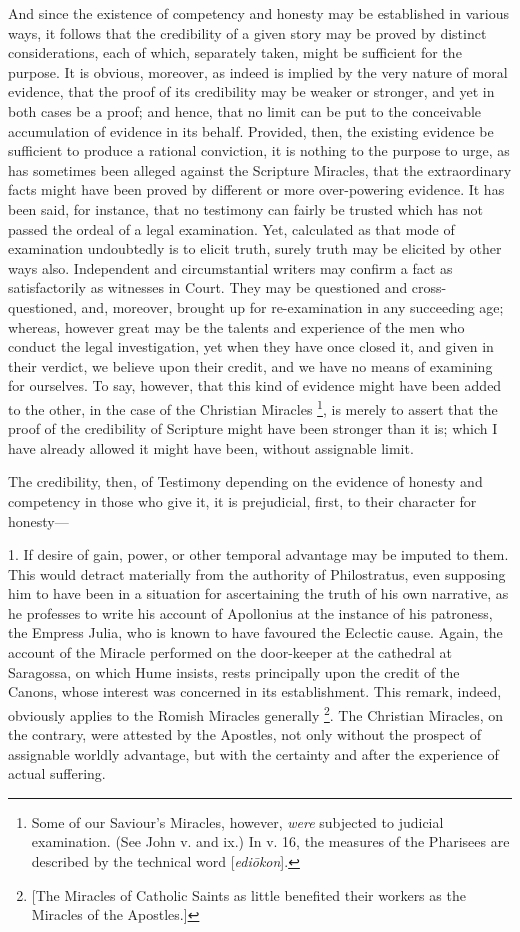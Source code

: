 And since the existence of competency and honesty
may be established in various ways, it follows that the credibility of
a given story may be proved by distinct considerations, each of which,
separately taken, might be sufficient for the purpose. It is obvious,
moreover, as indeed is implied by the very nature of moral evidence,
that the proof of its credibility may be weaker or stronger, and yet
in both cases be a proof; and hence, that no limit can be put to the
conceivable accumulation of evidence in its behalf. Provided, then,
the existing evidence be sufficient to produce a rational conviction,
it is nothing to the purpose to urge, as has sometimes been alleged
against the Scripture Miracles, that the extraordinary facts might
have been proved by different or more over-powering evidence. It has
been said, for instance, that no testimony can fairly be trusted which
has not passed the ordeal of a legal examination. Yet, calculated as
that mode of examination undoubtedly is to elicit truth, surely truth
may be elicited by other ways also. Independent and circumstantial
writers may confirm a fact as satisfactorily as witnesses in Court.
They may be questioned and cross-questioned, and, moreover, brought up
for re-examination in any succeeding age; whereas, however great may
be the talents and experience of the men who conduct the legal
investigation, yet when they have once closed it, and given in their
verdict, we believe upon their credit, and we have no means of
examining for ourselves. To say, however, that this kind of evidence
might have been added to the other, in the case of the Christian Miracles
\footnote{Some of our Saviour's Miracles, however, \emph{were} subjected to
judicial examination. (See John v. and ix.) In v. 16, the measures of
the Pharisees are described by the technical word [\emph{edi\={o}kon}].}, is merely to assert that
the proof of the credibility of Scripture might have been stronger
than it is; which I have already allowed it might have been, without
assignable limit.

The credibility, then, of Testimony depending on
the evidence of honesty and competency in those who give it, it is
prejudicial, first, to their character for honesty—

1. If desire of gain, power, or other temporal
advantage may be imputed to them. This would detract materially from
the authority of Philostratus, even supposing him to have been in a
situation for ascertaining the truth of his own narrative, as he
professes to write his account of Apollonius at the instance of his
patroness, the Empress Julia, who is known to have favoured the
Eclectic cause. Again, the account of the Miracle performed on the
door-keeper at the cathedral at Saragossa, on which Hume insists,
rests principally upon the credit of the Canons, whose interest was
concerned in its establishment. This remark, indeed, obviously applies
to the Romish Miracles generally \footnote{[The Miracles of Catholic Saints as little benefited their workers as
the Miracles of the Apostles.]}. The Christian Miracles, on the contrary, were attested by the
Apostles, not only without the prospect of assignable worldly
advantage, but with the certainty and after the experience of actual
suffering.

